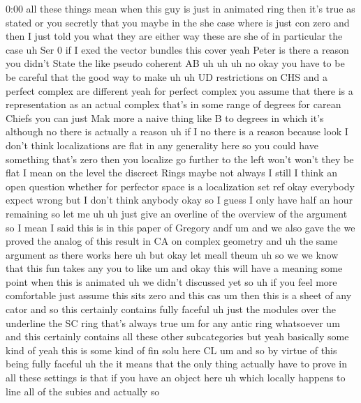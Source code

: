 \begin{unfinished}{0:00}
all  these  things  mean  when  this  guy  is
just  in  animated  ring  then  it's  true  as
stated  or  you  secretly  that  you  maybe  in
the  she  case  where  is  just  con  zero  and
then  I  just  told  you  what  they  are
either  way  these  are  she
of  in  particular  the
case
uh  Ser  0  if  I  exed  the  vector  bundles
this
cover
yeah  Peter  is  there  a  reason  you  didn't
State  the  like  pseudo  coherent
AB  uh  uh
uh  no
okay  you  have  to  be  be  careful  that  the
good  way  to  make  uh  uh  UD  restrictions
on  CHS  and  a  perfect  complex  are
different  yeah  for  perfect  complex  you
assume  that  there  is  a  representation  as
an  actual  complex  that's  in  some  range
of  degrees  for  carean  Chiefs  you  can
just  Mak  more  a  naive  thing  like  B  to
degrees  in  which
it's  although  no  there  is  actually  a
reason  uh  if  I  no  there  is  a  reason
because  look  I  don't  think  localizations
are  flat  in  any  generality  here  so  you
could  have  something  that's  zero  then
you  localize  go  further  to  the  left
won't  won't  they  be  flat  I  mean  on  the
level  the  discreet
Rings  maybe  not
always  I  still  I  think  an  open  question
whether  for  perfector  space  is  a
localization  set  ref  okay  everybody
expect  wrong  but  I  don't  think
anybody  okay  so  I  guess  I  only  have  half
an  hour  remaining  so  let  me  uh  uh  just
give  an  overline  of  the  overview  of  the
argument
so  I  mean  I  said  this  is  in  this  paper
of  Gregory
andf
um  and  we  also  gave  the  we  proved  the
analog  of  this  result  in  CA  on  complex
geometry  and  uh  the  same  argument  as
there  works
here  uh  but  okay  let  meall
theum
uh  so
we  we  know  that  this  fun  takes  any  you
to
like
um
and  okay  this  will  have  a  meaning  some
point  when  this  is  animated
uh  we  didn't  discussed  yet  so  uh  if  you
feel  more  comfortable  just  assume  this
sits  zero  and  this  cas  um  then  this  is  a
sheet
of  any
cator  and  so  this  certainly  contains
fully
faceful  uh  just  the  modules  over  the
underline  the  SC  ring  that's  always
true  um  for  any  antic  ring  whatsoever
um  and  this  certainly  contains  all  these
other
subcategories
but  yeah  basically  some  kind  of  yeah
this  is  some  kind  of  fin  solu
here
CL  um
and  so  by  virtue  of  this  being  fully
faceful  uh
the  it  means  that  the  only  thing
actually  have  to  prove  in  all  these
settings  is  that  if  you  have  an  object
here  uh  which  locally  happens  to  line
all  of  the  subies  and  actually  so

\end{unfinished}

